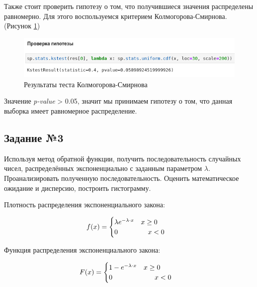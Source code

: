 \documentclass[14pt,fleqn]{extarticle}
\begin{document}
   	Также стоит проверить гипотезу о том, что получившиеся значения распределены равномерно. Для этого воспользуемся критерием Колмогорова-Смирнова. (Рисунок \ref{fig:linear_congruent_gauge_a_b_test})
	\begin{figure}[h]
		\centering \includegraphics[scale=0.6]{linear_congruent_gauge_a_b_test}
		\caption{Результаты теста Колмогорова-Смирнова}
		\label{fig:linear_congruent_gauge_a_b_test}
	\end{figure}
	
	Значение \textit{p-value} > 0.05, значит мы принимаем гипотезу о том, что данная выборка имеет равномерное распределение.
	
	\subsection*{Задание №3}
	Используя метод обратной функции, получить последовательность случайных чисел, распределённых экспоненциально с заданным параметром $\lambda$. Проанализировать полученную последовательность. Оценить математическое ожидание  и дисперсию, построить гистограмму.\\
	\newline
	
	Плотность распределения экспоненциального закона:
	\begin{ceqn}
	\begin{align*}
		f(x) =
		\begin{cases}
			\lambda e^{-\lambda \cdot x} \quad x \geq 0\\
			0 \hspace{1.55cm} x < 0
		\end{cases}
	\end{align*}
	\end{ceqn}

	Функция распределения экспоненциального закона:
	\begin{ceqn}
	\begin{align*}
		F(x) =
		\begin{cases}
			1 - e^{-\lambda \cdot x} \quad x \geq 0\\
			0 \hspace{2.15cm} x < 0
		\end{cases}
	\end{align*}
	\end{ceqn}
\end{document}
